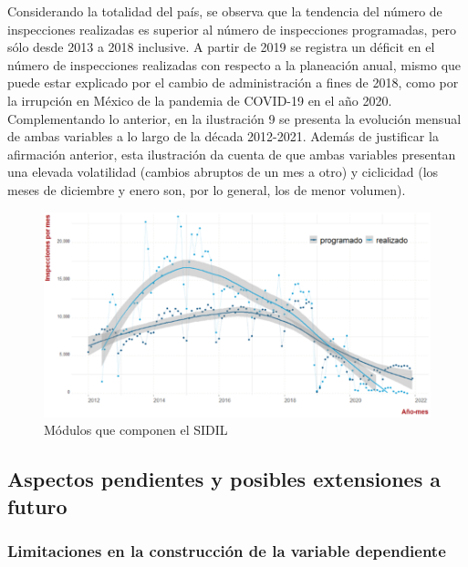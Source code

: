\documentclass[
]{article}
\begin{document}
Considerando la totalidad del país, se observa que la tendencia del número de inspecciones realizadas es superior al número de inspecciones programadas, pero sólo desde 2013 a 2018 inclusive. A partir de 2019 se registra un déficit en el número de inspecciones realizadas con respecto a la planeación anual, mismo que puede estar explicado por el cambio de administración a fines de 2018, como por la irrupción en México de la pandemia de COVID-19 en el año 2020. Complementando lo anterior, en la ilustración 9 se presenta la evolución mensual de ambas variables a lo largo de la década 2012-2021. Además de justificar la afirmación anterior, esta ilustración da cuenta de que ambas variables presentan una elevada volatilidad (cambios abruptos de un mes a otro) y ciclicidad (los meses de diciembre y enero son, por lo general, los de menor volumen).

\begin{figure}
\includegraphics[width=12.56in]{images-1/08/programadorealizado} \caption{Módulos que componen el SIDIL}\label{fig:programadorealizado}
\end{figure}

\hypertarget{aspectos-pendientes-y-posibles-extensiones-a-futuro}{%
\subsection{Aspectos pendientes y posibles extensiones a futuro}\label{aspectos-pendientes-y-posibles-extensiones-a-futuro}}

\hypertarget{limitaciones-en-la-construcciuxf3n-de-la-variable-dependiente}{%
\subsubsection{Limitaciones en la construcción de la variable dependiente}\label{limitaciones-en-la-construcciuxf3n-de-la-variable-dependiente}}
\end{document}
